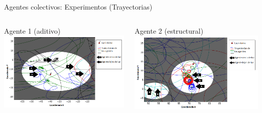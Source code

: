 \documentclass[aspectratio=169]{beamer}
\begin{document}
\begin{frame}{Agentes colectivos: Experimentos (Trayectorias)}
  \begin{columns}
    \begin{column}{0.50\textwidth}
      \begin{block}{Agente 1 (aditivo)}
        \vspace{0.5cm}
      \includegraphics[width=1.1\textwidth,height=.6\textheight]{Imagenes/Agente1Trayectoria}
    \end{block}
    \end{column}
    \begin{column}{0.5\textwidth}
      \begin{block}{Agente 2 (estructural)}
        \vspace{0.5cm}
      \includegraphics[width=1.1\textwidth,height=.6\textheight]{Imagenes/Agente2Trayectoria}
      \end{block}
    \end{column}
  \end{columns}
\end{frame}
\end{document}
